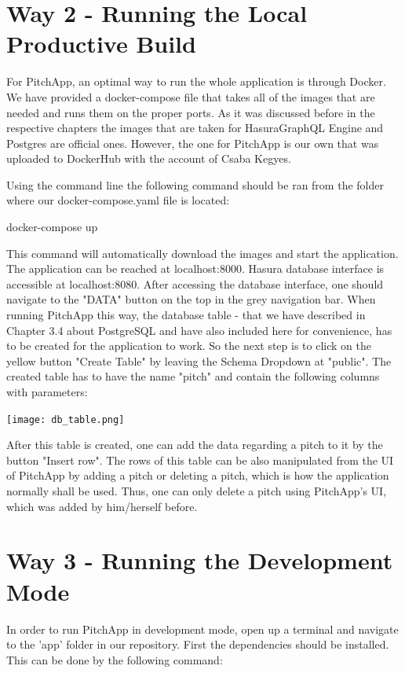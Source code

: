 \section{Way 2 - Running the Local Productive Build}

For PitchApp, an optimal way to run the whole application is through Docker. We have provided a docker-compose file that takes all of the images that are needed and runs them on the proper ports. As it was discussed before in the respective chapters the images that are taken for HasuraGraphQL Engine and Postgres are official ones. However, the one for PitchApp is our own that was uploaded to DockerHub with the account of Csaba Kegyes.
 
Using the command line the following command should be ran from the folder where our docker-compose.yaml file is located:

docker-compose up

This command will automatically download the images and start the application. The application can be reached at localhost:8000. Hasura database interface is accessible at localhost:8080. After accessing the database interface, one should navigate to the "DATA" button on the top in the grey navigation bar. When running PitchApp this way, the database table - that we have described in Chapter 3.4 about PostgreSQL and have also included here for convenience, has to be created for the application to work. So the next step is to click on the yellow button "Create Table" by leaving the Schema Dropdown at "public". The created table has to have the name "pitch" and contain the following columns with parameters:

\begin{center}
	\texttt{[image: db\_table.png]}
\end{center}

After this table is created, one can add the data regarding a pitch to it by the button "Insert row". The rows of this table can be also manipulated from the UI of PitchApp by adding a pitch or deleting a pitch, which is how the application normally shall be used. Thus, one can only delete a pitch using PitchApp's UI, which was added by him/herself before.


\section{Way 3 - Running the Development Mode}

In order to run PitchApp in development mode, open up a terminal and navigate to the 'app' folder in our repository. First the dependencies should be installed. This can be done by the following command:

